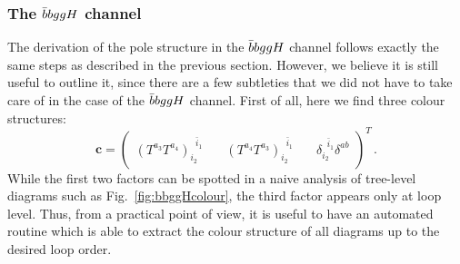 \documentclass[main.tex]{subfiles}
\begin{document}
\subsubsection{The $\bar{b}bggH$ channel}
The derivation of the pole structure in the $\bar{b}bggH$ channel follows exactly the same steps as described in the previous section. However, we believe it is still useful to outline it, since there are a few subtleties that we did not have to take care of in the case of the $\bar{b}bggH$ channel. First of all, here we find three colour structures:
\begin{equation}
    \bm{c} = 
    \begin{pmatrix}
        (T^{a_3}T^{a_4})_{i_2}^{\;\;\bar{i}_1} & \quad (T^{a_4}T^{a_3})_{i_2}^{\;\;\bar{i}_1}
        & \quad \delta_{i_2}^{\;\;\bar{i}_1} \delta^{ab}
    \end{pmatrix}^T\,.
\end{equation}
While the first two factors can be spotted in a naive analysis of tree-level diagrams such as Fig.~\ref{fig:bbggHcolour}, the third factor appears only at loop level. Thus, from a practical point of view, it is useful to have an automated routine which is able to extract the colour structure of all diagrams up to the desired loop order.
\end{document}
